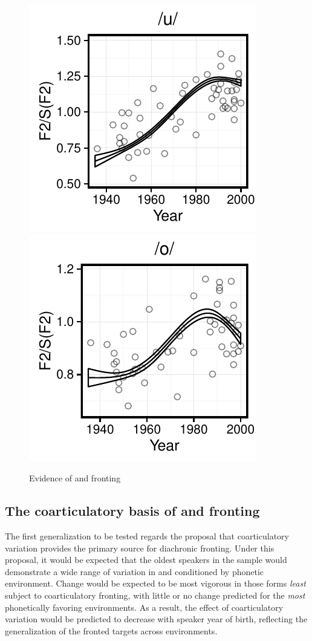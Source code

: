 \documentclass[12pt]{article}
\begin{document}
\vspace*{6pt}
\begin{figure}[H]
\centering
\includegraphics{uwchange}
\includegraphics{owchange}
\caption{Evidence of  and  fronting}
\end{figure}
\vspace*{6pt}

\subsection{The coarticulatory basis of  and  fronting}

The first generalization to be tested regards the proposal that coarticulatory variation provides the primary source for diachronic fronting. Under this proposal, it would be expected that the oldest speakers in the sample would demonstrate a wide range of variation in  and  conditioned by phonetic environment. Change would be expected to be most vigorous in those forms \textit{least} subject to coarticulatory fronting, with little or no change predicted for the \textit{most} phonetically favoring environments. As a result, the effect of coarticulatory variation would be predicted to decrease with speaker year of birth, reflecting the generalization of the fronted targets across environments. 
\end{document}
